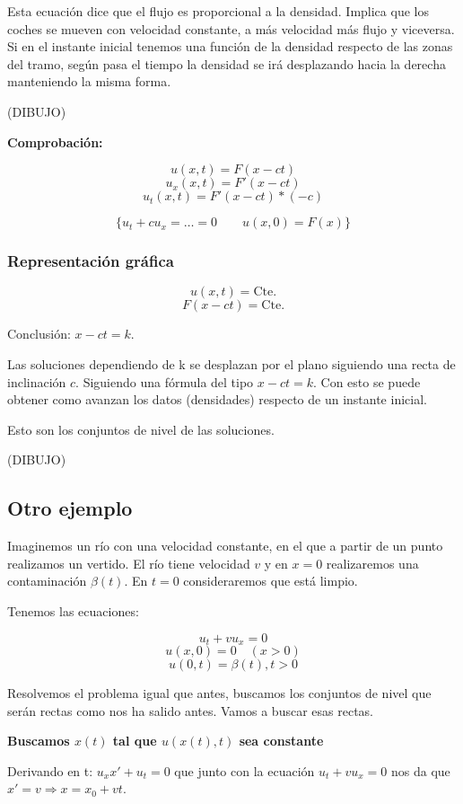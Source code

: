 		Esta ecuación dice que el flujo es proporcional a la densidad. Implica que los coches se mueven con velocidad constante, a más velocidad más flujo y viceversa. Si en el instante inicial tenemos una función de la densidad respecto de las zonas del tramo, según pasa el tiempo la densidad se irá desplazando hacia la derecha manteniendo la misma forma.

		(DIBUJO)

		\textbf{Comprobación:}

		$$ u(x,t) = F(x-ct) $$
		$$ u_x(x,t) = F'(x-ct)$$
		$$u_t(x,t) = F'(x-ct)*(-c)$$

		$$ \{ u_t + cu_x = … = 0 \quad\quad u(x,0) = F(x) \} $$

		\subsubsection{Representación gráfica}


			$$u(x,t) = \text{Cte.}$$
			$$F(x - ct) = \text{Cte.}$$

			Conclusión: $x-ct = k$.


			Las soluciones dependiendo de k se desplazan por el plano siguiendo una recta de inclinación $c$. Siguiendo una fórmula del tipo $x-ct = k$. Con esto se puede obtener como avanzan los datos (densidades) respecto de un instante inicial.

			Esto son los conjuntos de nivel de las soluciones.

			(DIBUJO)



	\subsection{Otro ejemplo}

		Imaginemos un río con una velocidad constante, en el que a partir de un punto realizamos un vertido. El río tiene velocidad $v$ y en $x=0$ realizaremos una contaminación $\beta(t)$. En $t=0$ consideraremos que está limpio.

		Tenemos las ecuaciones:

		$$u_t + vu_x = 0$$
		$$u(x,0) = 0 \quad (x>0) $$
		$$u(0,t) = \beta(t), t>0$$


		Resolvemos el problema igual que antes, buscamos los conjuntos de nivel que serán rectas como nos ha salido antes. Vamos a buscar esas rectas.

		\textbf{Buscamos $x(t)$ tal que $u(x(t),t)$ sea constante}

		Derivando en t: $u_x x' + u_t = 0$ que junto con la ecuación $u_t + v u_x = 0$ nos da que $x' = v \Rightarrow x = x_0 + vt $.

